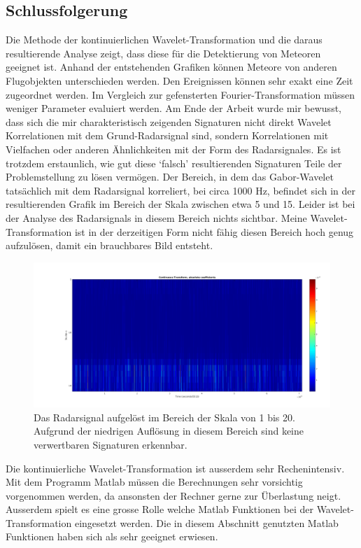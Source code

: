 \begin{refsection}
\newpage
\section{Schlussfolgerung}

Die Methode der kontinuierlichen Wavelet-Transformation und die daraus resultierende Analyse zeigt, dass diese für die Detektierung von Meteoren geeignet ist.
Anhand der entstehenden Grafiken können Meteore von anderen Flugobjekten unterschieden werden.
Den Ereignissen können sehr exakt eine Zeit zugeordnet werden.
Im Vergleich zur gefensterten Fourier-Transformation müssen weniger Parameter evaluiert werden.
Am Ende der Arbeit wurde mir bewusst, dass sich die mir charakteristisch zeigenden Signaturen nicht direkt Wavelet Korrelationen mit dem Grund-Radarsignal sind, sondern Korrelationen mit Vielfachen oder anderen Ähnlichkeiten mit der Form des Radarsignales.
Es ist trotzdem erstaunlich, wie gut diese `falsch' resultierenden Signaturen Teile der Problemstellung zu lösen vermögen.
Der Bereich, in dem das Gabor-Wavelet tatsächlich mit dem Radarsignal korreliert, bei circa 1000 Hz, befindet sich in der resultierenden Grafik im Bereich der Skala zwischen etwa 5 und 15.
Leider ist bei der Analyse des Radarsignals in diesem Bereich nichts sichtbar.
Meine Wavelet-Transformation ist in der derzeitigen Form nicht fähig diesen Bereich hoch genug aufzulösen, damit ein brauchbares Bild entsteht.
\begin{figure}[h!]
	\centering
	\includegraphics[width=\linewidth]{papers/meteor/images/anomalie/cwt_signal_scale1to20.png}
	\caption{Das Radarsignal aufgelöst im Bereich der Skala von 1 bis 20. 
	Aufgrund der niedrigen Auflösung in diesem Bereich sind keine verwertbaren Signaturen erkennbar.}
	\label{fig:signalmitwscaloscale1to20}
\end{figure}

Die kontinuierliche Wavelet-Transformation ist ausserdem sehr Rechenintensiv. 
Mit dem Programm Matlab müssen die Berechnungen sehr vorsichtig vorgenommen werden, da ansonsten der Rechner gerne zur Überlastung neigt.
Ausserdem spielt es eine grosse Rolle welche Matlab Funktionen bei der Wavelet-Transformation eingesetzt werden.
Die in diesem Abschnitt genutzten Matlab Funktionen haben sich als sehr geeignet erwiesen.  

\newpage
\printbibliography[heading=subbibliography]
\end{refsection}
